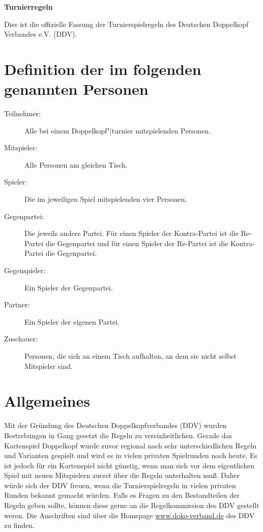 \documentclass[12pt]{scrartcl}
\begin{document}
\thispagestyle{empty}
\begin{titlepage}
  \begin{center}
    \Huge \textbf{Turnierregeln}
  \end{center}
  \tableofcontents
\end{titlepage}

Dies ist die offizielle Fassung der Turnierspielregeln des
Deutschen Doppelkopf Verbandes e.V. (DDV).


\section{Definition der im folgenden genannten Personen}
\begin{description}
  \item[Teilnehmer:] Alle bei einem Doppelkopf"|turnier mitspielenden Personen.
  \item[Mitspieler:] Alle Personen am gleichen Tisch.
  \item[Spieler:] Die im jeweiligen Spiel mitspielenden vier Personen.
  \item[Gegenpartei:] Die jeweils andere Partei. Für einen Spieler der Kontra-Partei ist die Re-Partei die Gegenpartei und für einen Spieler der Re-Partei ist die Kontra-Partei die Gegenpartei.
  \item[Gegenspieler:] Ein Spieler der Gegenpartei.
  \item[Partner:] Ein Spieler der eigenen Partei.
  \item[Zuschauer:] Personen, die sich an einem Tisch aufhalten, an dem sie nicht selbst Mitspieler sind.
\end{description}


\section{Allgemeines}
Mit der Gründung des Deutschen Doppelkopfverbandes (DDV) wurden Bestrebungen in Gang gesetzt die Regeln zu vereinheitlichen.  Gerade das Kartenspiel Doppelkopf wurde zuvor regional nach sehr unterschiedlichen Regeln und Varianten gespielt und wird es in vielen privaten Spielrunden noch heute. Es ist jedoch für ein Kartenspiel nicht günstig, wenn man sich vor dem eigentlichen Spiel mit neuen Mitspielern zuerst über die Regeln unterhalten muß. Daher würde sich der DDV freuen, wenn die Turnierspielregeln in vielen privaten Runden bekannt gemacht würden. Falls es Fragen zu den Bestandteilen der Regeln geben sollte, können diese gerne an die Regelkommission des DDV gestellt weren. Die Anschriften sind über die Homepage \href{http://www.doko-verband.de}{www.doko-verband.de} des DDV zu finden.
\end{document}
